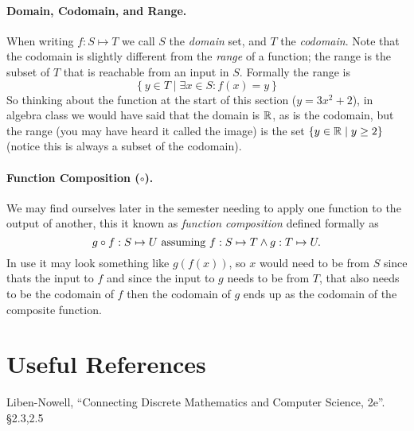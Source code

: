 \documentclass[11pt, oneside]{article}   	%
\begin{document}
\paragraph{Domain, Codomain, and Range.}
When writing $f: S \mapsto T$ we call $S$ the \emph{domain} set, and $T$ the \emph{codomain}. 
Note that the codomain is slightly different from the \emph{range} of a function; 
the range is the subset of $T$ that is reachable from an input in $S$. 
Formally the range is 
\[
\left\{y \in T \mid \exists x \in S : f(x) = y\right\}
\]
So thinking about the function at the start of this section ($y = 3x^2 + 2$), 
in algebra class we would have said that the domain is $\operatorname{\mathbb{R}}$, as is the codomain, but the range (you may have heard it called the image) 
is the set $\left\{y \in \operatorname{\mathbb{R}} \mid y \ge 2\right\}$ (notice this is always a subset of the codomain). 

\paragraph{Function Composition ($\circ$).}
We may find ourselves later in the semester needing to apply one function to the output of another,
this it known as \emph{function composition} defined formally as
\[
g\circ f: S \mapsto U \textnormal{ assuming } f: S \mapsto T \wedge g : T \mapsto U.
\]
In use it may look something like $g\left(f\left(x\right)\right)$, 
so $x$ would need to be from $S$ since thats the input to $f$ and since the input to $g$ needs to be from $T$, 
that also needs to be the codomain of $f$ then the codomain of $g$ ends up as the codomain of the composite function. 

\section*{Useful References}
Liben-Nowell, ``Connecting Discrete Mathematics and Computer Science, 2e''. \S 2.3,2.5
\end{document}
